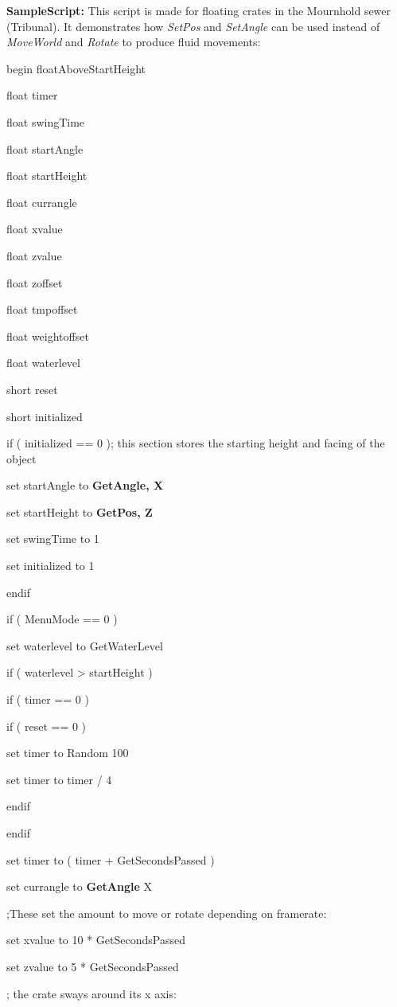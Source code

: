 \documentclass[
]{article}
\begin{document}
\textbf{SampleScript:} This script is made for floating crates in the
Mournhold sewer (Tribunal). It demonstrates how \emph{SetPos} and
\emph{SetAngle} can be used instead of \emph{MoveWorld} and
\emph{Rotate} to produce fluid movements:

begin floatAboveStartHeight

float timer

float swingTime

float startAngle

float startHeight

float currangle

float xvalue

float zvalue

float zoffset

float tmpoffset

float weightoffset

float waterlevel

short reset

short initialized

if ( initialized == 0 ); this section stores the starting height and
facing of the object

set startAngle to \textbf{GetAngle, X}

set startHeight to \textbf{GetPos, Z}

set swingTime to 1

set initialized to 1

endif

if ( MenuMode == 0 )

set waterlevel to GetWaterLevel

if ( waterlevel \textgreater{} startHeight )

if ( timer == 0 )

if ( reset == 0 )

set timer to Random 100

set timer to timer / 4

endif

endif

set timer to ( timer + GetSecondsPassed )

set currangle to \textbf{GetAngle} X

;These set the amount to move or rotate depending on framerate:

set xvalue to 10 * GetSecondsPassed

set zvalue to 5 * GetSecondsPassed

; the crate sways around its x axis:
\end{document}
